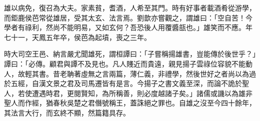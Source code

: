 \begin{pinyinscope}
雄以病免，復召為大夫。家素貧，耆酒，人希至其門。時有好事者載酒肴從游學，而鉅鹿侯芭常從雄居，受其太玄、法言焉。劉歆亦嘗觀之，謂雄曰：「空自苦！今學者有祿利，然尚不能明易，又如玄何？吾恐後人用覆醬瓿也。」雄笑而不應。年七十一，天鳳五年卒，侯芭為起墳，喪之三年。

時大司空王邑、納言嚴尤聞雄死，謂桓譚曰：「子嘗稱揚雄書，豈能傳於後世乎？」譚曰：「必傳。顧君與譚不及見也。凡人賤近而貴遠，親見揚子雲祿位容貌不能動人，故輕其書。昔老聃著虛無之言兩篇，薄仁義，非禮學，然後世好之者尚以為過於五經，自漢文景之君及司馬遷皆有是言。今揚子之書文義至深，而論不詭於聖人，若使遭遇時君，更閱賢知，為所稱善，則必度越諸子矣。」諸儒或譏以為雄非聖人而作經，猶春秋吳楚之君僭號稱王，蓋誅絕之罪也。自雄之沒至今四十餘年，其法言大行，而玄終不顯，然篇籍具存。


\end{pinyinscope}
